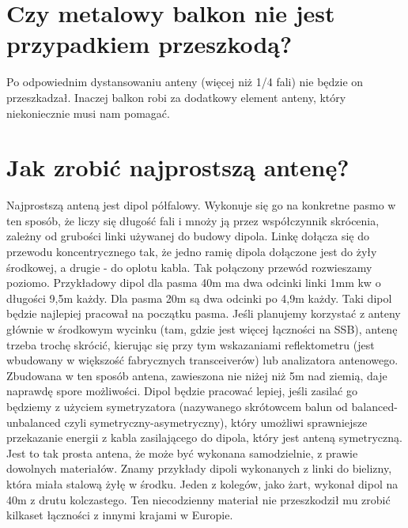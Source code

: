 \documentclass[a4paper,12pt]{article}
\begin{document}
\section{Czy metalowy balkon nie jest przypadkiem przeszkodą?}
Po odpowiednim dystansowaniu anteny (więcej niż 1/4 fali) nie będzie on przeszkadzał. Inaczej balkon robi za dodatkowy element anteny, który niekoniecznie musi nam pomagać.

\section{Jak zrobić najprostszą antenę?}
Najprostszą anteną jest dipol półfalowy. Wykonuje się go na konkretne pasmo w ten sposób, że liczy się długość fali i mnoży ją przez współczynnik skrócenia, zależny od grubości linki używanej do budowy dipola. Linkę dołącza się do przewodu koncentrycznego tak, że jedno ramię dipola dołączone jest do żyły środkowej, a drugie - do oplotu kabla. Tak połączony przewód rozwieszamy poziomo. Przykładowy dipol dla pasma 40m ma dwa odcinki linki 1mm kw o długości 9,5m każdy. Dla pasma 20m są dwa odcinki po 4,9m każdy. Taki dipol będzie najlepiej pracował na początku pasma. Jeśli planujemy korzystać z anteny głównie w środkowym wycinku (tam, gdzie jest więcej łączności na SSB), antenę trzeba trochę skrócić, kierując się przy tym wskazaniami reflektometru (jest wbudowany w większość fabrycznych transceiverów) lub analizatora antenowego. Zbudowana w ten sposób antena, zawieszona nie niżej niż 5m nad ziemią, daje naprawdę spore możliwości. Dipol będzie pracować lepiej, jeśli zasilać go będziemy z użyciem symetryzatora (nazywanego skrótowcem balun od balanced-unbalanced czyli symetryczny-asymetryczny), który umożliwi sprawniejsze przekazanie energii z kabla zasilającego do dipola, który jest anteną symetryczną.
Jest to tak prosta antena, że może być wykonana samodzielnie, z prawie dowolnych materiałów. Znamy przykłady dipoli wykonanych z linki do bielizny, która miała stalową żyłę w środku. Jeden z kolegów, jako żart, wykonał dipol na 40m z drutu kolczastego. Ten niecodzienny materiał nie przeszkodził mu zrobić kilkaset łączności z innymi krajami w Europie.
\end{document}
